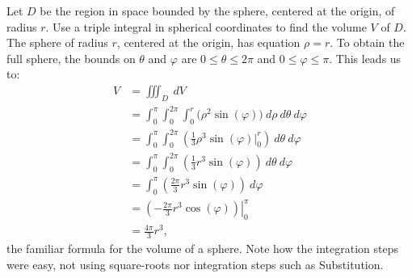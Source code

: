 {Let $D$ be the region in space bounded by the sphere, centered at the origin, of radius $r$. Use a triple integral in spherical coordinates to find the volume $V$ of $D$.}
{The sphere of radius $r$, centered at the origin, has equation $\rho = r$. To obtain the full sphere, the bounds on $\theta$ and $\varphi$ are $0\leq \theta \leq 2\pi$ and $0 \leq \varphi \leq \pi$. This leads us to:
\begin{align*}
V &= \iiint_D\ dV\\
	&= \int_0^{\pi}\int_0^{2\pi}\int_0^r\big(\rho^2\sin(\varphi)\big)\ d\rho\ d\theta\ d\varphi\\
	&= \int_0^\pi\int_0^{2\pi}\left(\frac13\rho^3\sin(\varphi)\Big|_0^r\right)\ d\theta\ d\varphi\\
	&= \int_0^\pi\int_0^{2\pi} \left(\frac13r^3\sin(\varphi)\right)\ d\theta\ d\varphi\\
	&= \int_0^\pi \left(\frac{2\pi}3r^3\sin(\varphi)\right)\ d\varphi\\
	&= \left.\left(-\frac{2\pi}3r^3\cos(\varphi)\right)\right|_0^{\pi}\\
	&= \frac{4\pi}3r^3,
\end{align*}
the familiar formula for the volume of a sphere. Note how the integration steps were easy, not using square-roots nor integration steps such as Substitution.}


